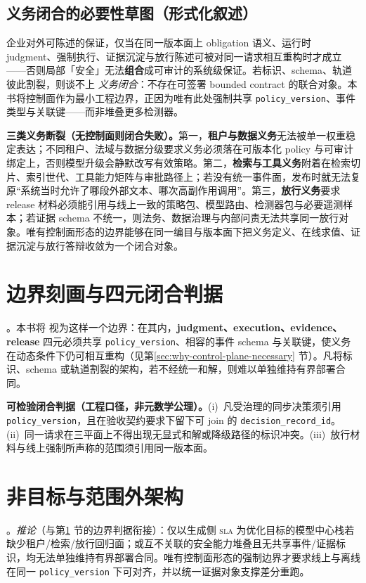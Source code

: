 \documentclass[11pt,a4paper]{report}
\begin{document}
\subsection{义务闭合的必要性草图（形式化叙述）}
企业对外可陈述的保证，仅当在同一版本面上 obligation 语义、运行时 judgment、强制执行、证据沉淀与放行陈述可被对同一请求相互重构时才成立——否则局部「安全」无法\textbf{组合}成可审计的系统级保证。若标识、schema、轨道彼此割裂，则谈不上 \emph{义务闭合}：不存在可签署 bounded contract 的联合对象。本书将控制面作为最小工程边界，正因为唯有此处强制共享 \texttt{policy\_version}、事件类型与关联键——而非堆叠更多检测器。

\noindent\textbf{三类义务断裂（无控制面则闭合失败）。}第一，\textbf{租户与数据义务}无法被单一权重稳定表达；不同租户、法域与数据分级要求义务必须落在可版本化 policy 与可审计绑定上，否则模型升级会静默改写有效策略。第二，\textbf{检索与工具义务}附着在检索切片、索引世代、工具能力矩阵与审批路径上；若没有统一事件面，发布时就无法复原“系统当时允许了哪段外部文本、哪次高副作用调用”。第三，\textbf{放行义务}要求 release 材料必须能引用与线上一致的策略包、模型路由、检测器包与必要遥测样本；若证据 schema 不统一，则法务、数据治理与内部问责无法共享同一放行对象。唯有控制面形态的边界能够在同一编目与版本面下把义务定义、在线求值、证据沉淀与放行答辩收敛为一个闭合对象。

\section{边界刻画与四元闭合判据}\label{sec:boundary-characterization}
\ControlPlane{}。本书将 \ControlPlane{} 视为这样一个边界：在其内，\textbf{judgment、execution、evidence、release} 四元必须共享 \texttt{policy\_version}、相容的事件 schema 与关联键，使义务在动态条件下仍可相互重构（见第\ref{sec:why-control-plane-necessary} 节）。凡将标识、schema 或轨道割裂的架构，若不经统一和解，则难以单独维持有界部署合同。

\noindent\textbf{可检验闭合判据（工程口径，非元数学公理）。}(i)~凡受治理的同步决策须引用 \texttt{policy\_version}，且在验收契约要求下留下可 join 的 \texttt{decision\_record\_id}。(ii)~同一请求在三平面上不得出现无显式和解或降级路径的标识冲突。(iii)~放行材料与线上强制所声称的范围须引用同一版本面。

\section{非目标与范围外架构}
\ControlPlane{}。\emph{推论}（与第\ref{sec:boundary-characterization} 节的边界判据衔接）：仅以生成侧 \textsc{sla} 为优化目标的模型中心栈若缺少租户/检索/放行回归面；或互不关联的安全能力堆叠且无共享事件/证据标识，均无法单独维持有界部署合同。唯有控制面形态的强制边界才要求线上与离线在同一 \texttt{policy\_version} 下可对齐，并以统一证据对象支撑差分重跑。
\end{document}
